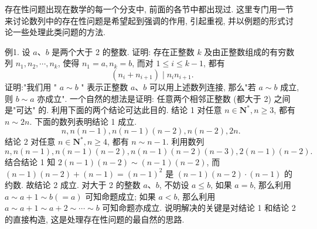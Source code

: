 
存在性问题出现在数学的每一个分支中, 前面的各节中都出现过.
这里专门用一节来讨论数列中的存在性问题是希望起到强调的作用, 引起重视, 并以例题的形式讨论一些处理此类问题的方法.



例1. 设 $a 、 b$ 是两个大于 2 的整数.
证明: 存在正整数 $k$ 及由正整数组成的有穷数列 $n_1, n_2, \cdots, n_k$, 使得 $n_1=a, n_k=b$, 而对 $1 \leqslant i \leqslant k-1$, 都有
$$
\left(n_i+n_{i+1}\right) \mid n_i n_{i+1} .
$$
证明:"我们用 " $a \sim b$ " 表示正整数 $a 、 b$ 可以用上述数列连接, 那么"若 $a \sim b$ 成立, 则 $b \sim a$ 亦成立".
一个自然的想法是证明: 任意两个相邻正整数 (都大于 2) 之间是"可达" 的.
利用下面的两个结论可达此目的.
结论 1 对任意 $n \in \mathbf{N}^*, n \geqslant 3$, 都有 $n \sim 2 n$.
下面的数列表明结论 1 成立.
$$
n, n(n-1), n(n-1)(n-2), n(n-2), 2 n \text {. }
$$
结论 2 对任意 $n \in \mathbf{N}^*, n \geqslant 4$, 都有 $n \sim n-1$.
利用数列
$$
n, n(n-1), n(n-1)(n-2), n(n-1)(n-2)(n-3), 2(n-1)(n-2) .
$$
结合结论 1 知 $2(n-1)(n-2) \sim(n-1)(n-2)$, 而 $(n-1)(n-2)+(n-1)= (n-1)^2$ 是 $(n-1)(n-2) \cdot(n-1)$ 的约数.
故结论 2 成立.
对大于 2 的整数 $a 、 b$, 不妨设 $a \leqslant b$, 如果 $a=b$, 那么利用 $a \sim a+1 \sim b(=a)$ 可知命题成立; 如果 $a<b$, 那么利用 $a \sim a+1 \sim a+2 \sim \cdots \sim b$ 可知命题亦成立.
说明解决的关键是对结论 1 和结论 2 的直接构造, 这是处理存在性问题的最自然的思路.



